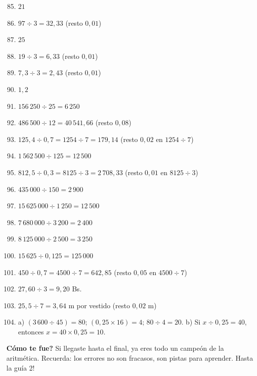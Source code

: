 \documentclass[12pt, letterpaper]{article}
\begin{document}
  \begin{enumerate}[leftmargin=*, label=\textbf{\arabic*.}]
    \setcounter{enumi}{84}
    \item $21$
    \item $97 \div 3 = 32{,}33$ (resto $0{,}01$)
    \item $25$
    \item $19 \div 3 = 6{,}33$ (resto $0{,}01$)
    \item $7{,}3 \div 3 = 2{,}43$ (resto $0{,}01$)
    \item $1{,}2$
    \item $156\,250 \div 25 = 6\,250$
    \item $486\,500 \div 12 = 40\,541{,}66$ (resto $0{,}08$)
    \item $125{,}4 \div 0{,}7 = 1254 \div 7 = 179{,}14$ (resto $0{,}02$ en $1254 \div 7$)
    \item $1\,562\,500 \div 125 = 12\,500$
    \item $812{,}5 \div 0{,}3 = 8125 \div 3 = 2\,708{,}33$ (resto $0{,}01$ en $8125 \div 3$)
    \item $435\,000 \div 150 = 2\,900$
    \item $15\,625\,000 \div 1\,250 = 12\,500$
    \item $7\,680\,000 \div 3\,200 = 2\,400$
    \item $8\,125\,000 \div 2\,500 = 3\,250$
    \item $15\,625 \div 0{,}125 = 125\,000$
    \item $450 \div 0{,}7 = 4500 \div 7 = 642{,}85$ (resto $0{,}05$ en $4500 \div 7$)
    \item $27{,}60 \div 3 = 9{,}20$ Bs.
    \item $25{,}5 \div 7 = 3{,}64$ m por vestido (resto $0{,}02$ m)
    \item a) $(3\,600 \div 45) = 80$; $(0{,}25 \times 16) = 4$; $80 \div 4 = 20$. \quad b) Si $x \div 0{,}25 = 40$, entonces $x = 40 \times 0{,}25 = 10$.
  \end{enumerate}

  \vspace{10pt}
  \begin{cuadrosolucion}
    \textbf{\textquestiondown Cómo te fue?} Si llegaste hasta el final, ya eres todo un campeón de la aritmética. Recuerda: los errores no son fracasos, son pistas para aprender. \textquestiondown Hasta la guía 2!
  \end{cuadrosolucion}

\fi
\end{document}
